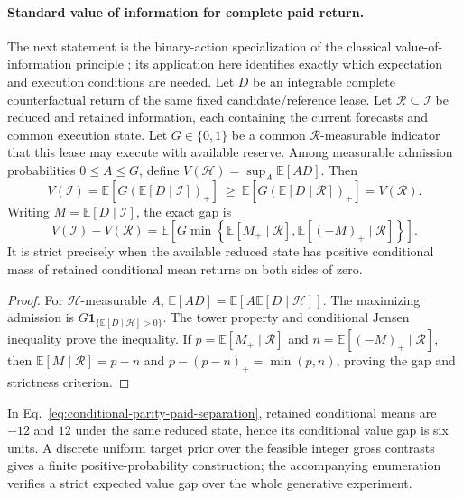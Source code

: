 \documentclass[10pt]{article}
\begin{document}
\paragraph{Standard value of information for complete paid return.}
The next statement is the binary-action specialization of the classical
value-of-information principle \cite{blackwell1953}; its application here
identifies exactly which expectation and execution conditions are needed.
Let $D$ be an integrable complete counterfactual return of the same fixed
candidate/reference lease.  Let $\mathcal R\subseteq\mathcal I$ be reduced
and retained information, each containing the current forecasts and common
execution state.  Let $G\in\{0,1\}$ be a common
$\mathcal R$-measurable indicator that this lease may execute with available
reserve.  Among measurable admission probabilities $0\leq A\leq G$, define
$V(\mathcal H)=\sup_A\mathbb E[AD]$.  Then
\begin{equation}
 V(\mathcal I)=\mathbb E[G(\mathbb E[D\mid\mathcal I])_+]
 \ \geq\ 
 \mathbb E[G(\mathbb E[D\mid\mathcal R])_+]=V(\mathcal R).
 \label{eq:conditional-complete-value-envelope}
\end{equation}
Writing $M=\mathbb E[D\mid\mathcal I]$, the exact gap is
\begin{equation}
 V(\mathcal I)-V(\mathcal R)=
 \mathbb E\left[G\min\left\{
 \mathbb E[M_+\mid\mathcal R],
 \mathbb E[(-M)_+\mid\mathcal R]\right\}\right].
 \label{eq:conditional-complete-value-strictness}
\end{equation}
It is strict precisely when the available reduced state has positive
conditional mass of retained conditional mean returns on both sides of zero.
\begin{proof}
For $\mathcal H$-measurable $A$,
$\mathbb E[AD]=\mathbb E[A\mathbb E[D\mid\mathcal H]]$.
The maximizing admission is $G\mathbf1_{\{\mathbb E[D\mid\mathcal H]>0\}}$.
The tower property and conditional Jensen inequality prove the inequality.
If $p=\mathbb E[M_+\mid\mathcal R]$ and
$n=\mathbb E[(-M)_+\mid\mathcal R]$, then
$\mathbb E[M\mid\mathcal R]=p-n$ and
$p-(p-n)_+=\min(p,n)$, proving the gap and strictness criterion.
\end{proof}
In Eq.~\eqref{eq:conditional-parity-paid-separation}, retained conditional
means are $-12$ and $12$ under the same reduced state, hence its conditional
value gap is six units.  A discrete uniform target prior over the feasible
integer gross contrasts gives a finite positive-probability construction;
the accompanying enumeration verifies a strict expected value gap over the
whole generative experiment.
\end{document}
